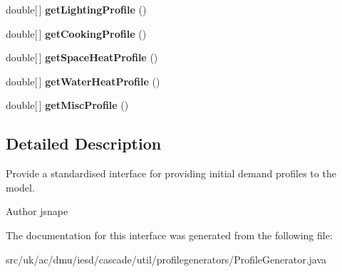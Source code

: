 \begin{DoxyCompactItemize}
\item 
\hypertarget{interfaceuk_1_1ac_1_1dmu_1_1iesd_1_1cascade_1_1util_1_1profilegenerators_1_1_profile_generator_a5d5ddc5c30e0d36e9a02ea99822d31a2}{double\mbox{[}$\,$\mbox{]} {\bfseries get\-Lighting\-Profile} ()}\label{interfaceuk_1_1ac_1_1dmu_1_1iesd_1_1cascade_1_1util_1_1profilegenerators_1_1_profile_generator_a5d5ddc5c30e0d36e9a02ea99822d31a2}

\item 
\hypertarget{interfaceuk_1_1ac_1_1dmu_1_1iesd_1_1cascade_1_1util_1_1profilegenerators_1_1_profile_generator_a1dcc58776daaf62cc7274e429011a057}{double\mbox{[}$\,$\mbox{]} {\bfseries get\-Cooking\-Profile} ()}\label{interfaceuk_1_1ac_1_1dmu_1_1iesd_1_1cascade_1_1util_1_1profilegenerators_1_1_profile_generator_a1dcc58776daaf62cc7274e429011a057}

\item 
\hypertarget{interfaceuk_1_1ac_1_1dmu_1_1iesd_1_1cascade_1_1util_1_1profilegenerators_1_1_profile_generator_a6daf282d4089cbb713ac76516ef42374}{double\mbox{[}$\,$\mbox{]} {\bfseries get\-Space\-Heat\-Profile} ()}\label{interfaceuk_1_1ac_1_1dmu_1_1iesd_1_1cascade_1_1util_1_1profilegenerators_1_1_profile_generator_a6daf282d4089cbb713ac76516ef42374}

\item 
\hypertarget{interfaceuk_1_1ac_1_1dmu_1_1iesd_1_1cascade_1_1util_1_1profilegenerators_1_1_profile_generator_a704e83b65e4c7d67d501de2a1fda1047}{double\mbox{[}$\,$\mbox{]} {\bfseries get\-Water\-Heat\-Profile} ()}\label{interfaceuk_1_1ac_1_1dmu_1_1iesd_1_1cascade_1_1util_1_1profilegenerators_1_1_profile_generator_a704e83b65e4c7d67d501de2a1fda1047}

\item 
\hypertarget{interfaceuk_1_1ac_1_1dmu_1_1iesd_1_1cascade_1_1util_1_1profilegenerators_1_1_profile_generator_ac767903804d0de680508c761192ebcbf}{double\mbox{[}$\,$\mbox{]} {\bfseries get\-Misc\-Profile} ()}\label{interfaceuk_1_1ac_1_1dmu_1_1iesd_1_1cascade_1_1util_1_1profilegenerators_1_1_profile_generator_ac767903804d0de680508c761192ebcbf}

\end{DoxyCompactItemize}


\subsection{Detailed Description}
Provide a standardised interface for providing initial demand profiles to the model. 

\begin{DoxyAuthor}{Author}
jsnape 
\end{DoxyAuthor}


The documentation for this interface was generated from the following file\-:\begin{DoxyCompactItemize}
\item 
src/uk/ac/dmu/iesd/cascade/util/profilegenerators/Profile\-Generator.\-java\end{DoxyCompactItemize}
